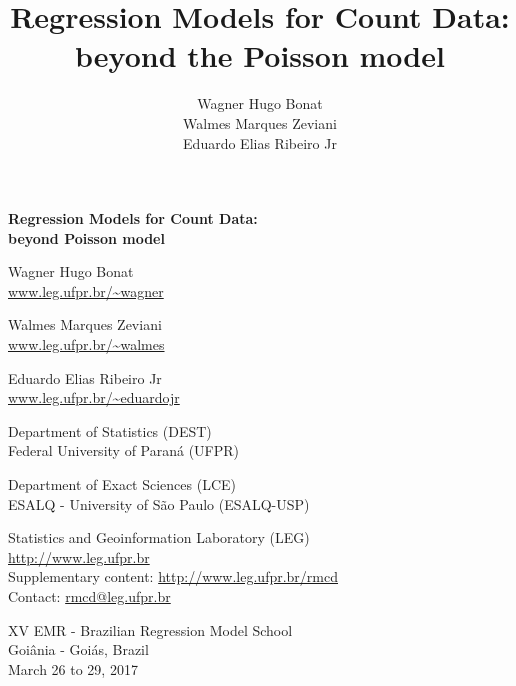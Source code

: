 \documentclass[9pt,a5paper,]{book}
\title{Regression Models for Count Data: beyond the Poisson model}
\author{Wagner Hugo Bonat \\ Walmes Marques Zeviani \\ Eduardo Elias Ribeiro Jr}
\date{}
\theoremstyle{definition}
\theoremstyle{definition}
\theoremstyle{remark}
\begin{document}
\maketitle

\thispagestyle{empty}
\cleardoublepage
\thispagestyle{empty}


\begin{flushleft}
  \Large \bf
  Regression Models for Count Data:\\
  beyond Poisson model
\end{flushleft}
\vspace*{1.5em}

\begin{flushleft}
Wagner Hugo Bonat\footnotemark[1] \footnotemark[3]\\
\url{www.leg.ufpr.br/~wagner}

Walmes Marques Zeviani\footnotemark[1] \footnotemark[3]\\
\url{www.leg.ufpr.br/~walmes}

Eduardo Elias Ribeiro Jr\footnotemark[2] \footnotemark[3]\\
\url{www.leg.ufpr.br/~eduardojr}
\end{flushleft}
\vspace*{2em}


\footnotemark[1]Department of Statistics (DEST)\\
\hspace*{1.5mm}Federal University of Paraná (UFPR)

\footnotemark[2]Department of Exact Sciences (LCE)\\
\hspace*{1.5mm}ESALQ - University of São Paulo (ESALQ-USP)

\footnotemark[3]Statistics and Geoinformation Laboratory (LEG)\\
\hspace*{1.5mm}\url{http://www.leg.ufpr.br}\\

Supplementary content: \url{http://www.leg.ufpr.br/rmcd}\\
Contact: \url{rmcd@leg.ufpr.br}
\vspace*{\fill}

\begin{center}
XV EMR - Brazilian Regression Model School\\
Goiânia - Goiás, Brazil\\
March 26 to 29, 2017
\end{center}
\end{document}
